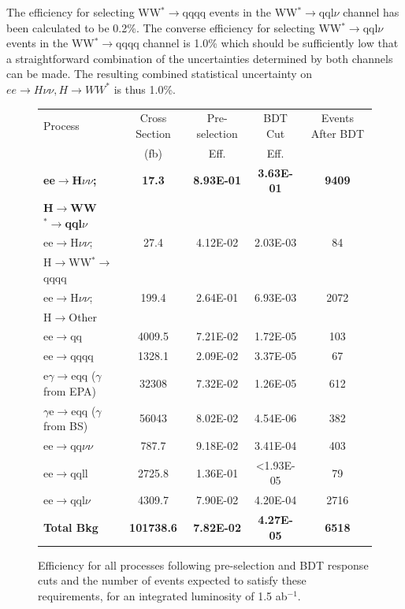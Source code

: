 The efficiency for selecting WW$^*\rightarrow$qqqq events in the WW$^*\rightarrow$qql$\nu$ channel has been calculated to be 0.2\%. The converse efficiency for selecting WW$^*\rightarrow$qql$\nu$ events in the WW$^*\rightarrow$qqqq channel is 1.0\% which should be sufficiently low that a straightforward combination of the uncertainties determined by both channels can be made. The resulting combined statistical uncertainty on $ee\rightarrow H\nu\nu, H\rightarrow WW^*$ is thus 1.0\%.

\begin{figure}
  \centering
  \begin{tabular}{l c c c c}
   \toprule
    Process & Cross Section & Pre-selection & BDT Cut  & Events After BDT     \\
    & (fb) & Eff. & Eff. &      \\
    \midrule
    \midrule
    \bf{ee$\rightarrow$H$\nu\nu$;}            & \bf{17.3}    &  \bf{8.93E-01}  & \bf{3.63E-01} & \bf{9409}    \\
    \bf{H$\rightarrow$WW$^*\rightarrow$qql$\nu$} & & & & \\
    \midrule
    \midrule
    ee$\rightarrow$H$\nu\nu$;  & 27.4    & 4.12E-02 & 2.03E-03 & 84  \\
    H$\rightarrow$WW$^*\rightarrow$qqqq & & & & \\
    ee$\rightarrow$H$\nu\nu$; & 199.4 & 2.64E-01 & 6.93E-03 & 2072 \\
    H$\rightarrow$Other & & & & \\
    \midrule
    \midrule
    ee$\rightarrow$qq               & 4009.5    & 7.21E-02 &  1.72E-05 & 103  \\ 
    ee$\rightarrow$qqqq               & 1328.1    &  2.09E-02 & 3.37E-05 & 67   \\ 
    e$\gamma$$\rightarrow$eqq ($\gamma$ from EPA)                 & 32308    & 7.32E-02  & 1.26E-05 & 612  \\ 
    $\gamma$e$\rightarrow$eqq ($\gamma$ from BS)               &  56043   & 8.02E-02 & 4.54E-06 & 382  \\ 
    ee$\rightarrow$qq$\nu\nu$               & 787.7    & 9.18E-02 & 3.41E-04 & 403   \\ 
    ee$\rightarrow$qqll               & 2725.8    & 1.36E-01  & <1.93E-05 & 79    \\ 
    ee$\rightarrow$qql$\nu$              & 4309.7    & 7.90E-02  & 4.20E-04 & 2716    \\ 
    \midrule
    \midrule
    \bf{Total Bkg}                    & \bf{101738.6} & \bf{7.82E-02} & \bf{4.27E-05} & \bf{6518} \\
    \midrule
    \bottomrule
  \end{tabular}
  \caption[Samples Used]{Efficiency for all processes following pre-selection and BDT response cuts and the number of events expected to satisfy these requirements, for an integrated luminosity of 1.5 ab$^{-1}$.}
  \label{cuts}
\end{figure}

